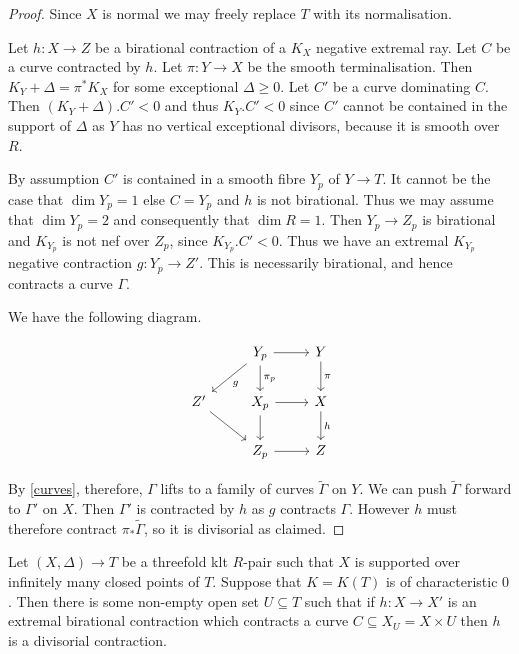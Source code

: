 	\begin{proof}
		
		Since $X$ is normal we may freely replace $T$ with its normalisation.
		
		Let $h:X \to Z$ be a birational contraction of a $K_{X}$ negative extremal ray. Let $C$ be a curve contracted by $h$. Let $\pi:Y \to X$ be the smooth terminalisation. Then $K_{Y}+\Delta=\pi^{*}K_{X}$ for some exceptional $\Delta \geq 0$. Let $C'$ be a curve dominating $C$. Then $(K_{Y}+\Delta).C' <0$ and thus $K_{Y}.C' < 0$ since $C'$ cannot be contained in the support of $\Delta$ as $Y$ has no vertical exceptional divisors, because it is smooth over $R$.
		
		By assumption $C'$ is contained in a smooth fibre $Y_{p}$ of $Y \to T$. It cannot be the case that $\dim Y_{p}=1$ else $C=Y_{p}$ and $h$ is not birational. Thus we may assume that $\dim Y_{p}=2$ and consequently that $\dim R=1$. Then $Y_{p} \to Z_{p}$ is birational and $K_{Y_{p}}$ is not nef over $Z_{p}$, since $K_{Y_{p}}.C' < 0$. Thus we have an extremal $K_{Y_{p}}$ negative contraction $g:Y_{p} \to Z'$. This is necessarily birational, and hence contracts a curve $\Gamma$.
		
		We have the following diagram.
		
		\[\begin{tikzcd}
		& Y_{p} \arrow[ld, "g"] \arrow[r]  \arrow[d, "\pi_{p}"]& Y \arrow[d, "\pi"] \\
		Z' \arrow[rd]         & X_{p} \arrow[r] \arrow[d]         & X \arrow[d, "h"]   \\
		& Z_{p} \arrow[r]                & Z                 
		\end{tikzcd}\]
		
		
		By \autoref{curves}, therefore, $\Gamma$ lifts to a family of curves $\tilde{\Gamma}$ on $Y$. We can push $\tilde{\Gamma}$ forward to $\Gamma'$ on $X$. Then $\Gamma'$ is contracted by $h$ as $g$ contracts $\Gamma$. However $h$ must therefore contract $\pi_{*}\tilde{\Gamma}$, so it is divisorial as claimed. 		
	\end{proof}

	\begin{theorem}\label{open-1}
		Let $(X,\Delta) \to T$ be a threefold klt $R$-pair such that $X$ is supported over infinitely many closed points of $T$. Suppose that $K=K(T)$ is of characteristic $0$. Then there is some non-empty open set $U \subseteq T$ such that if $h:X \to X'$ is an extremal birational contraction which contracts a curve $C\subseteq X_{U}=X\times U$ then $h$ is a divisorial contraction.
	\end{theorem}
	
